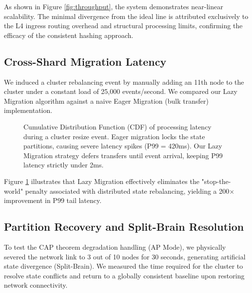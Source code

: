 \documentclass[conference]{IEEEtran}
\begin{document}
As shown in Figure \ref{fig:throughput}, the system demonstrates near-linear scalability. The minimal divergence from the ideal line is attributed exclusively to the L4 ingress routing overhead and structural processing limits, confirming the efficacy of the consistent hashing approach.

\subsection{Cross-Shard Migration Latency}
We induced a cluster rebalancing event by manually adding an 11th node to the cluster under a constant load of 25,000 events/second. We compared our Lazy Migration algorithm against a naive Eager Migration (bulk transfer) implementation.

\begin{figure}[htbp]
\centering
{}
\caption{Cumulative Distribution Function (CDF) of processing latency during a cluster resize event. Eager migration locks the state partitions, causing severe latency spikes (P99 = 420ms). Our Lazy Migration strategy defers transfers until event arrival, keeping P99 latency strictly under 2ms.}
\label{fig:migration}
\end{figure}

Figure \ref{fig:migration} illustrates that Lazy Migration effectively eliminates the "stop-the-world" penalty associated with distributed state rebalancing, yielding a 200$\times$ improvement in P99 tail latency.

\subsection{Partition Recovery and Split-Brain Resolution}
To test the CAP theorem degradation handling (AP Mode), we physically severed the network link to 3 out of 10 nodes for 30 seconds, generating artificial state divergence (Split-Brain). We measured the time required for the cluster to resolve state conflicts and return to a globally consistent baseline upon restoring network connectivity.
\end{document}
